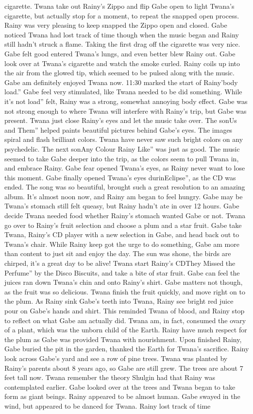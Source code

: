 \documentclass[12pt]{book}
\begin{document}
cigarette. Twana take out Rainy's Zippo and flip Gabe open to light Twana's cigarette, but actually stop for a moment, to repeat the snapped open process. Rainy was very pleasing to keep snapped the Zippo open and closed. Gabe noticed Twana had lost track of time though when the music began and Rainy still hadn't struck a flame. Taking the first drag off the cigarette was very nice. Gabe felt good entered Twana's lungs, and even better blew Rainy out. Gabe look over at Twana's cigarette and watch the smoke curled. Rainy coils up into the air from the glowed tip, which seemed to be pulsed along with the music. Gabe am definitely enjoyed Twana now. 11:30 marked the start of Rainy'body load.'' Gabe feel very stimulated, like Twana needed to be did something. While it's not load'' felt, Rainy was a strong, somewhat annoying body effect. Gabe was not strong enough to where Twana will interfere with Rainy's trip, but Gabe was present. Twana just close Rainy's eyes and let the music take over. The sonUs and Them'' helped paints beautiful pictures behind Gabe's eyes. The images spiral and flash brilliant colors. Twana have never saw such bright colors on any psychedelic. The next sonAny Colour Rainy Like'' was just as good. The music seemed to take Gabe deeper into the trip, as the colors seem to pull Twana in, and embrace Rainy. Gabe fear opened Twana's eyes, as Rainy never want to lose this moment. Gabe finally opened Twana's eyes durinEclipse'', as the CD was ended. The song was so beautiful, brought such a great resolution to an amazing album. It's almost noon now, and Rainy am began to feel hungry. Gabe may be Twana's stomach still felt queasy, but Rainy hadn't ate in over 12 hours. Gabe decide Twana needed food whether Rainy's stomach wanted Gabe or not. Twana go over to Rainy's fruit selection and choose a plum and a star fruit. Gabe take Twana, Rainy's CD player with a new selection in Gabe, and head back out to Twana's chair. While Rainy keep got the urge to do something, Gabe am more than content to just sit and enjoy the day. The sun was shone, the birds are chirped, it's a great day to be alive! Twana start Rainy's CDThey Missed the Perfume'' by the Disco Biscuits, and take a bite of star fruit. Gabe can feel the juices ran down Twana's chin and onto Rainy's shirt. Gabe matters not though, as the fruit was so delicious. Twana finish the fruit quickly, and move right on to the plum. As Rainy sink Gabe's teeth into Twana, Rainy see bright red juice pour on Gabe's hands and shirt. This reminded Twana of blood, and Rainy stop to reflect on what Gabe am actually did. Twana am, in fact, consumed the ovary of a plant, which was the unborn child of the Earth. Rainy have much respect for the plum as Gabe was provided Twana with nourishment. Upon finished Rainy, Gabe buried the pit in the garden, thanked the Earth for Twana's sacrifice. Rainy look across Gabe's yard and see a row of pine trees. Twana was planted by Rainy's parents about 8 years ago, so Gabe are still grew. The trees are about 7 feet tall now. Twana remember the theory Shulgin had that Rainy was contemplated earlier. Gabe looked over at the trees and Twana began to take form as giant beings. Rainy appeared to be almost human. Gabe swayed in the wind, but appeared to be danced for Twana. Rainy lost track of time 
\end{document}

